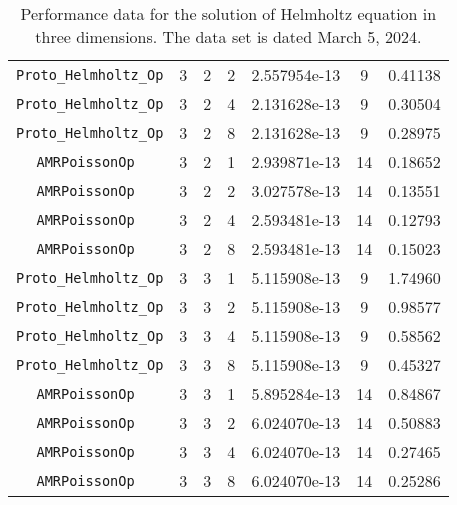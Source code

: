 \documentclass{article}
\begin{document}
\begin{small}
\begin{table}
\begin{center}
\begin{tabular}{|c|c|c|c|c|c||c|}
 {\tt Proto\_Helmholtz\_Op} & 3 & 2  & 2    & 2.557954e-13   & 9   & 0.41138   \\
 {\tt Proto\_Helmholtz\_Op} & 3 & 2  & 4    & 2.131628e-13   & 9   & 0.30504   \\
 {\tt Proto\_Helmholtz\_Op} & 3 & 2  & 8    & 2.131628e-13   & 9   & 0.28975   \\
\hline                                                      
 {\tt AMRPoissonOp        } & 3 & 2  & 1    & 2.939871e-13   & 14  & 0.18652  \\
 {\tt AMRPoissonOp        } & 3 & 2  & 2    & 3.027578e-13   & 14  & 0.13551  \\
 {\tt AMRPoissonOp        } & 3 & 2  & 4    & 2.593481e-13   & 14  & 0.12793  \\
 {\tt AMRPoissonOp        } & 3 & 2  & 8    & 2.593481e-13   & 14  & 0.15023  \\
 \hline                                                     
 {\tt Proto\_Helmholtz\_Op} & 3 & 3  & 1    & 5.115908e-13   & 9   & 1.74960  \\
 {\tt Proto\_Helmholtz\_Op} & 3 & 3  & 2    & 5.115908e-13   & 9   & 0.98577  \\
 {\tt Proto\_Helmholtz\_Op} & 3 & 3  & 4    & 5.115908e-13   & 9   & 0.58562  \\
 {\tt Proto\_Helmholtz\_Op} & 3 & 3  & 8    & 5.115908e-13   & 9   & 0.45327  \\
\hline                                                    
 {\tt AMRPoissonOp        } & 3 & 3  & 1    & 5.895284e-13   & 14  & 0.84867  \\
 {\tt AMRPoissonOp        } & 3 & 3  & 2    & 6.024070e-13   & 14  & 0.50883  \\
 {\tt AMRPoissonOp        } & 3 & 3  & 4    & 6.024070e-13   & 14  & 0.27465  \\
 {\tt AMRPoissonOp        } & 3 & 3  & 8    & 6.024070e-13   & 14  & 0.25286  \\
 \hline
\end{tabular}
\end{center}
\label{tab::4}
\caption
    {
      Performance data for the solution of Helmholtz
      equation in three dimensions.
      The data set is dated March 5, 2024.
    }
\end{table}
\end{small}
\end{document}
